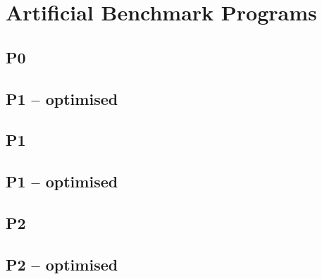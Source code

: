 \chapter{Artificial Benchmark Programs}
\label{app:artificial-benchmark-programs}

\section{P0}



\section{P1 -- optimised}



\section{P1}



\section{P1 -- optimised}



\section{P2}



\section{P2 -- optimised}



